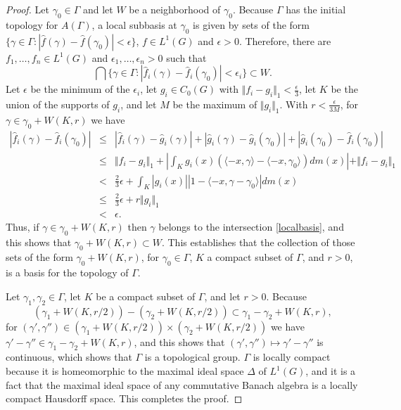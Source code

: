 \documentclass{article}
\newcommand{\inner}[2]{\langle #1, #2 \rangle}
\newcommand{\norm}[1]{\Vert #1 \Vert}
\begin{document}
\begin{proof}
Let $\gamma_0 \in \Gamma$ and let
 $W$ be a neighborhood of $\gamma_0$. Because $\Gamma$ has the initial topology for $A(\Gamma)$, 
a local subbasis at $\gamma_0$ is given by sets of the form $\{\gamma \in \Gamma: |\hat{f}(\gamma)-\hat{f}(\gamma_0)|<\epsilon\}$, $f \in L^1(G)$ and $\epsilon>0$.
Therefore, there are $f_1,\ldots,f_n \in L^1(G)$ and $\epsilon_1,\ldots,\epsilon_n>0$ such that
\begin{equation}
\bigcap \{\gamma \in \Gamma: |\hat{f}_i(\gamma)-\hat{f}_i(\gamma_0)|<\epsilon_i\} \subset W.
\label{localbasis}
\end{equation}
Let $\epsilon$ be the minimum of the $\epsilon_i$,  let $g_i \in C_0(G)$ with $\norm{f_i-g_i}_1 < \frac{\epsilon}{3}$,  let
$K$ be the union of the supports of $g_i$, and let $M$ be the maximum of $\norm{g_i}_1$. With
$r<\frac{\epsilon}{3M}$, for $\gamma \in \gamma_0+W(K,r)$ we have 
\begin{eqnarray*}
|\hat{f}_i(\gamma)-\hat{f}_i(\gamma_0)|&\leq&|\hat{f}_i(\gamma)-\hat{g}_i(\gamma)| + |\hat{g}_i(\gamma)-\hat{g}_i(\gamma_0)|
+|\hat{g}_i(\gamma_0)-\hat{f}_i(\gamma_0)|\\
&\leq&\norm{f_i-g_i}_1 +  \left| \int_K g_i(x)(\inner{-x}{\gamma}-\inner{-x}{\gamma_0}) dm(x) \right| + \norm{f_i-g_i}_1\\
&<&\frac{2}{3}\epsilon+\int_K |g_i(x)| |1-\inner{-x}{\gamma-\gamma_0}| dm(x)\\
&\leq&\frac{2}{3}\epsilon+r\norm{g_i}_1\\
&<&\epsilon.
\end{eqnarray*}
Thus, if $\gamma \in \gamma_0 + W(K,r)$ then $\gamma$ belongs to the intersection \eqref{localbasis}, and this shows
that $\gamma_0+W(K,r) \subset W$. This establishes that the collection of those sets of the form $\gamma_0+W(K,r)$, for
$\gamma_0 \in \Gamma$, $K$ a compact subset of $\Gamma$, and $r>0$, is a basis for the topology of $\Gamma$. 

Let $\gamma_1,\gamma_2 \in \Gamma$, let $K$ be a compact subset of $\Gamma$, and let $r>0$. Because
\[
(\gamma_1+W(K,r/2))-(\gamma_2+W(K,r/2)) \subset \gamma_1-\gamma_2 +W(K,r),
\]
for $(\gamma',\gamma'') \in (\gamma_1+W(K,r/2)) \times (\gamma_2 + W(K,r/2))$ we have
$\gamma'-\gamma'' \in \gamma_1-\gamma_2 + W(K,r)$, and this shows that $(\gamma',\gamma'') \mapsto
\gamma'-\gamma''$ is continuous, which shows that $\Gamma$ is a topological group. 
$\Gamma$ is locally compact because it is homeomorphic to the maximal ideal space $\Delta$ of $L^1(G)$, and it is a fact that
the maximal ideal space of any commutative Banach algebra is a locally compact Hausdorff space. This completes the proof.
\end{proof}
\end{document}

